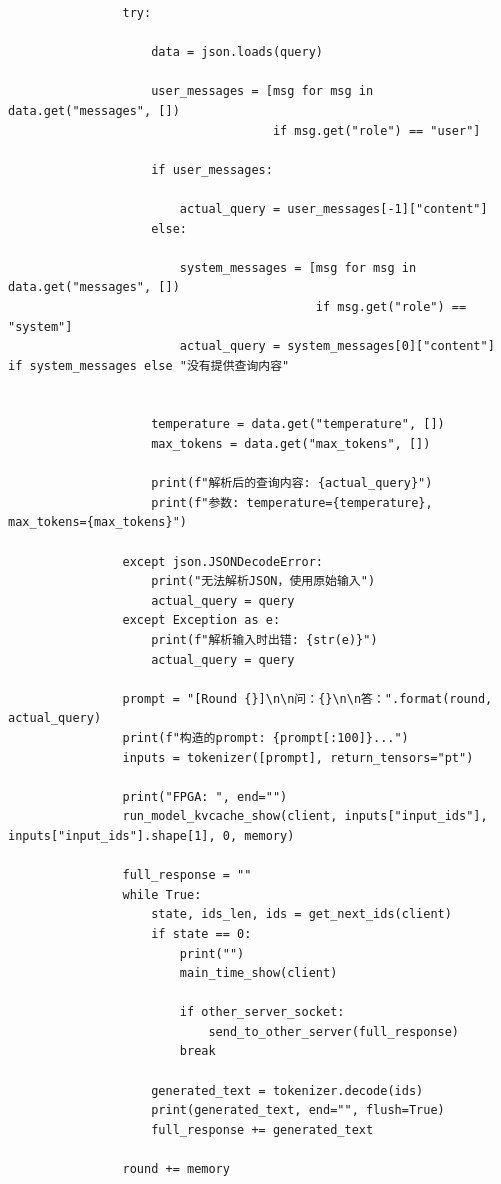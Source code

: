 \documentclass[AutoFakeBold,AutoFakeSlant,language=chinese,degree=bachelor]{sustechthesis}
\begin{document}
\begin{itemize}
\begin{lstlisting}
                try:

                    data = json.loads(query)

                    user_messages = [msg for msg in data.get("messages", [])
                                     if msg.get("role") == "user"]

                    if user_messages:

                        actual_query = user_messages[-1]["content"]
                    else:

                        system_messages = [msg for msg in data.get("messages", [])
                                           if msg.get("role") == "system"]
                        actual_query = system_messages[0]["content"] if system_messages else "没有提供查询内容"


                    temperature = data.get("temperature", [])
                    max_tokens = data.get("max_tokens", [])

                    print(f"解析后的查询内容: {actual_query}")
                    print(f"参数: temperature={temperature}, max_tokens={max_tokens}")

                except json.JSONDecodeError:
                    print("无法解析JSON，使用原始输入")
                    actual_query = query
                except Exception as e:
                    print(f"解析输入时出错: {str(e)}")
                    actual_query = query

                prompt = "[Round {}]\n\n问：{}\n\n答：".format(round, actual_query)
                print(f"构造的prompt: {prompt[:100]}...")
                inputs = tokenizer([prompt], return_tensors="pt")

                print("FPGA: ", end="")
                run_model_kvcache_show(client, inputs["input_ids"], inputs["input_ids"].shape[1], 0, memory)

                full_response = ""
                while True:
                    state, ids_len, ids = get_next_ids(client)
                    if state == 0:
                        print("")
                        main_time_show(client)

                        if other_server_socket:
                            send_to_other_server(full_response)
                        break

                    generated_text = tokenizer.decode(ids)
                    print(generated_text, end="", flush=True)
                    full_response += generated_text

                round += memory
        \end{lstlisting}
\end{itemize}
\end{document}
